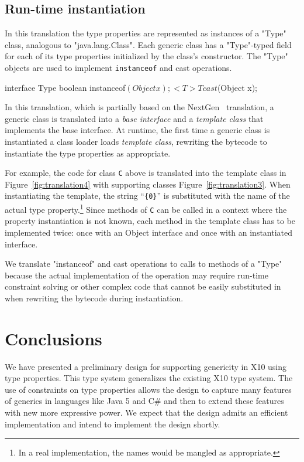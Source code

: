 \documentclass{llncs}
\begin{document}
\subsection{Run-time instantiation}

In this translation the type properties are represented as
instances of a \xcd"Type" class, analogous to \xcd"java.lang.Class". 
Each generic class has a \xcd"Type"-typed field for each of
its type properties initialized by the class's constructor.
The \xcd"Type" objects
are used to implement {\tt instanceof} and cast operations.
\begin{xten}
interface Type {
    boolean instanceof$(Object x);
    <T> T cast$(Object x);
}
\end{xten}


In this translation, which is partially based on the
NextGen~\cite{allen03,allen04} translation,
a generic class is translated into a \emph{base interface} and
a \emph{template class} that implements the base interface.
At runtime, the first time a generic class is instantiated
a class loader loads \emph{template class}, rewriting the
bytecode to instantiate the type properties as appropriate.

For example, the 
code for class {\tt C} above is translated into the template
class in Figure~\ref{fig:translation4}
with supporting classes Figure~\ref{fig:translation3}.
When instantiating the template, the string ``{\tt \{0\}}'' is
substituted with the name of the actual type
property.\footnote{In a real implementation, the names would be
mangled as appropriate.}
Since methods of {\tt C} can be called in a context where the
property instantiation is not known, 
each method in the template class has to be implemented twice:
once with an Object interface and once with an instantiated
interface.

We translate \xcd"instanceof" and cast operations to calls to
methods of a \xcd"Type" because the actual implementation of
the operation may require run-time constraint solving or other
complex code that cannot be easily substituted in when rewriting
the bytecode during instantiation.

\section{Conclusions}

We have presented a preliminary design for supporting genericity
in X10 using type properties.  This type system generalizes the
existing X10 type system.  The use of constraints on type
properties allows
the design to capture many features of generics in languages
like Java 5 and C\# and then to extend these features with new
more expressive power.
We expect that the design admits an efficient
implementation and intend to implement the design shortly.
\end{document}
